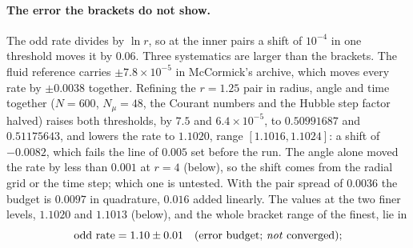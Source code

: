 \documentclass[11pt]{article}
\begin{document}
\paragraph{The error the brackets do not show.} The odd rate divides by $\ln r$, so at the inner pairs a shift of $10^{-4}$ in one threshold moves it by $0.06$. Three systematics are larger than the brackets. The fluid reference carries $\pm7.8\times10^{-5}$ in McCormick's archive, which moves every rate by $\pm0.0038$ together. Refining the $r=1.25$ pair in radius, angle and time together ($N=600$, $N_\mu=48$, the Courant numbers and the Hubble step factor halved) raises both thresholds, by $7.5$ and $6.4\times10^{-5}$, to $0.50991687$ and $0.51175643$, and lowers the rate to $1.1020$, range $[1.1016,1.1024]$: a shift of $-0.0082$, which fails the line of $0.005$ set before the run. The angle alone moved the rate by less than $0.001$ at $r=4$ (below), so the shift comes from the radial grid or the time step; which one is untested. With the pair spread of $0.0036$ the budget is $0.0097$ in quadrature, $0.016$ added linearly. The values at the two finer levels, $1.1020$ and $1.1013$ (below), and the whole bracket range of the finest, lie in
\begin{equation}
\text{odd rate}=1.10\pm0.01\quad\text{(error budget; \emph{not} converged)};
\end{equation}
\end{document}
